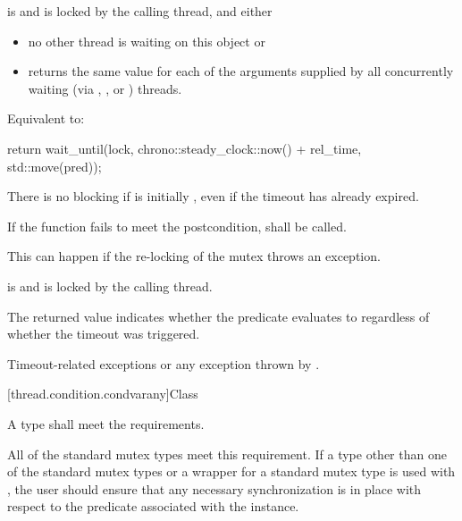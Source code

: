 \begin{itemdescr}
\pnum
\requires {} is  and 
is locked by the calling thread, and either
\begin{itemize}
\item
no other thread is waiting on this  object or

\item
{} returns the same value for each of the  arguments
supplied by all concurrently waiting (via , , or
) threads.
\end{itemize}

\pnum
\effects Equivalent to:
\begin{codeblock}
return wait_until(lock, chrono::steady_clock::now() + rel_time, std::move(pred));
\end{codeblock}

\pnum
\begin{note} There is no blocking if  is initially , even if the
timeout has already expired. \end{note}

\pnum
\remarks
If the function fails to meet the postcondition, 
shall be called.
\begin{note} This can happen if the re-locking of the mutex throws an exception. \end{note}

\pnum
\ensures {} is  and 
is locked by the calling thread.

\pnum
\begin{note} The returned value indicates whether the predicate evaluates to 
regardless of whether the timeout was triggered. \end{note}

\pnum
\throws Timeout-related
exceptions or any exception thrown by .

\end{itemdescr}

[thread.condition.condvarany]{Class }

\pnum
A  type shall meet the 
requirements. \begin{note} All of the standard
mutex types meet this requirement. If a  type other than one of the
standard mutex types or a  wrapper for a standard mutex type
is used with , the user should ensure that any
necessary synchronization is in place with respect to the predicate associated
with the  instance. \end{note}

